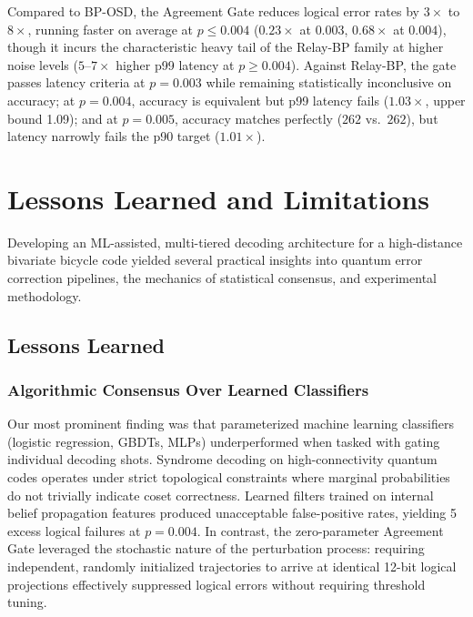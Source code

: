 Compared to BP-OSD, the Agreement Gate reduces logical error rates by $3\times$ to $8\times$, running faster on average at $p \le 0.004$ ($0.23\times$ at $0.003$, $0.68\times$ at $0.004$), though it incurs the characteristic heavy tail of the Relay-BP family at higher noise levels ($5\text{--}7\times$ higher p99 latency at $p \ge 0.004$). Against Relay-BP, the gate passes latency criteria at $p = 0.003$ while remaining statistically inconclusive on accuracy; at $p = 0.004$, accuracy is equivalent but p99 latency fails ($1.03\times$, upper bound 1.09); and at $p = 0.005$, accuracy matches perfectly ($262$ vs.\ $262$), but latency narrowly fails the p90 target ($1.01\times$).

\section{Lessons Learned and Limitations}

Developing an ML-assisted, multi-tiered decoding architecture for a high-distance bivariate bicycle code yielded several practical insights into quantum error correction pipelines, the mechanics of statistical consensus, and experimental methodology.

\subsection{Lessons Learned}

\subsubsection{Algorithmic Consensus Over Learned Classifiers}
Our most prominent finding was that parameterized machine learning classifiers (logistic regression, GBDTs, MLPs) underperformed when tasked with gating individual decoding shots. Syndrome decoding on high-connectivity quantum codes operates under strict topological constraints where marginal probabilities do not trivially indicate coset correctness. Learned filters trained on internal belief propagation features produced unacceptable false-positive rates, yielding 5 excess logical failures at $p = 0.004$. In contrast, the zero-parameter Agreement Gate leveraged the stochastic nature of the perturbation process: requiring independent, randomly initialized trajectories to arrive at identical 12-bit logical projections effectively suppressed logical errors without requiring threshold tuning.

